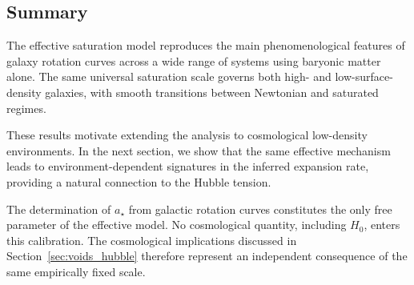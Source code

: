 \subsection{Summary}
  \label{subsec:rc_summary}

  The effective saturation model reproduces the main phenomenological features
  of galaxy rotation curves across a wide range of systems using baryonic matter alone.
  The same universal saturation scale governs both high- and
  low-surface-density galaxies, with smooth transitions between Newtonian and saturated regimes.

  These results motivate extending the analysis to cosmological low-density environments.
  In the next section, we show that the same effective mechanism leads to
  environment-dependent signatures in the inferred expansion rate, providing a
  natural connection to the Hubble tension.

  The determination of $a_\star$ from galactic rotation curves
  constitutes the only free parameter of the effective model.
  No cosmological quantity, including $H_0$, enters this calibration.
  The cosmological implications discussed in
  Section~\ref{sec:voids_hubble} therefore represent an independent
  consequence of the same empirically fixed scale.
